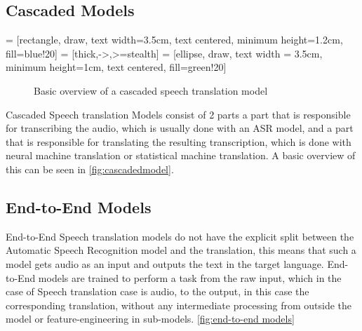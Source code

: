 \subsection{Cascaded Models}
 = [rectangle, draw, text width=3.5cm, text centered, minimum height=1.2cm, fill=blue!20]
 = [thick,->,>=stealth]
 = [ellipse, draw, text width = 3.5cm, minimum height=1cm, text centered, fill=green!20]

\begin{figure}
    \centering%
\caption{Basic overview of a cascaded speech translation model}
\label{fig:cascadedmodel}
\end{figure}
Cascaded Speech translation Models consist of 2 parts a part that is responsible for transcribing the audio, which is usually done with an ASR model, and a part that is responsible for translating the resulting transcription, which is done with neural machine translation or statistical machine translation. A basic overview of this can be seen in \autoref{fig:cascadedmodel}.

\subsection{End-to-End Models}
End-to-End Speech translation models do not have the explicit split between the Automatic Speech Recognition model and the translation, this means that such a model gets audio as an input and outputs the text in the target language. 
End-to-End models are trained to perform a task from the raw input, which in the case of Speech translation case is audio, to the output, in this case the corresponding translation, without any intermediate processing from outside the model or feature-engineering in sub-models. \autoref{fig:end-to-end models}

